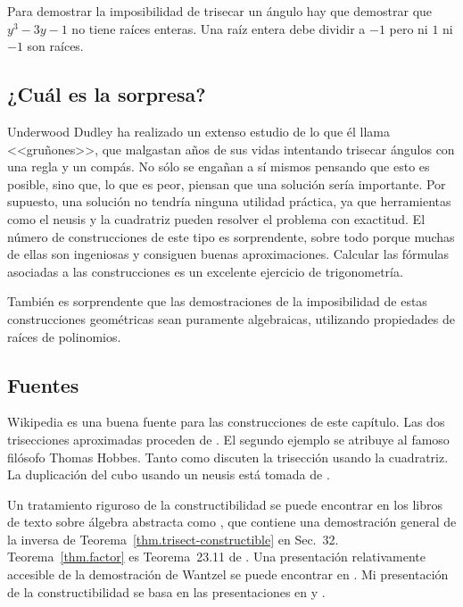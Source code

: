 Para demostrar la imposibilidad de trisecar un ángulo hay que demostrar que $y^3-3y-1$ no tiene raíces enteras. Una raíz entera debe dividir a $-1$ pero ni $1$ ni $-1$ son raíces.

\subsection*{¿Cuál es la sorpresa?}

Underwood Dudley ha realizado un extenso estudio de lo que él llama <<gruñones>>, que malgastan años de sus vidas intentando trisecar ángulos con una regla y un compás. No sólo se engañan a sí mismos pensando que esto es posible, sino que, lo que es peor, piensan que una solución sería importante. Por supuesto, una solución no tendría ninguna utilidad práctica, ya que herramientas como el neusis y la cuadratriz pueden resolver el problema con exactitud. El número de construcciones de este tipo es sorprendente, sobre todo porque muchas de ellas son ingeniosas y consiguen buenas aproximaciones. Calcular las fórmulas asociadas a las construcciones es un excelente ejercicio de trigonometría.

También es sorprendente que las demostraciones de la imposibilidad de estas construcciones geométricas sean puramente algebraicas, utilizando propiedades de raíces de polinomios.

\subsection*{Fuentes}

Wikipedia \cite{wiki:tri, wiki:neu, wiki:quad} es una buena fuente para las construcciones de este capítulo. Las dos trisecciones aproximadas proceden de \cite[pp.~67--68, 95--96]{dudley-budget}. El segundo ejemplo se atribuye al famoso filósofo Thomas Hobbes. Tanto \cite[pp.~48--49]{martin} como \cite[pp.~6--7]{dudley-budget} discuten la trisección usando la cuadratriz.
La duplicación del cubo usando un neusis está tomada de \cite{dorrie2}.

Un tratamiento riguroso de la constructibilidad se puede encontrar en los libros de texto sobre álgebra abstracta como \cite{fraleigh}, que contiene una demostración general de la inversa de Teorema~\ref{thm.trisect-constructible} en Sec.~32. Teorema~\ref{thm.factor} es Teorema~23.11 de \cite{fraleigh}. Una presentación relativamente accesible de la demostración de Wantzel se puede encontrar en \cite{suzuki}. Mi presentación de la constructibilidad se basa en las presentaciones en \cite[Capítulo~III]{courant} y \cite{laugwitz}.
